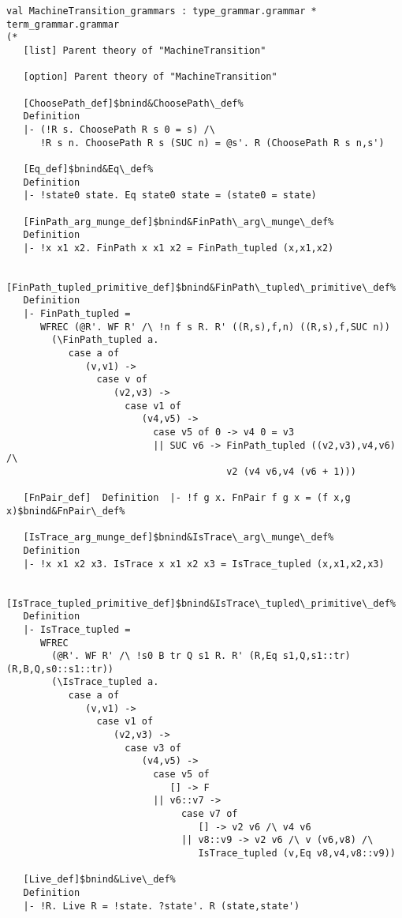 \documentclass[12pt]{article}
\begin{document}
\begin{footnotesize}
\begin{Verbatim}[commandchars=\$\&\%]
  val MachineTransition_grammars : type_grammar.grammar * term_grammar.grammar
(*
   [list] Parent theory of "MachineTransition"
   
   [option] Parent theory of "MachineTransition"
   
   [ChoosePath_def]$bnind&ChoosePath\_def%
   Definition
   |- (!R s. ChoosePath R s 0 = s) /\
      !R s n. ChoosePath R s (SUC n) = @s'. R (ChoosePath R s n,s')
   
   [Eq_def]$bnind&Eq\_def%
   Definition
   |- !state0 state. Eq state0 state = (state0 = state)
   
   [FinPath_arg_munge_def]$bnind&FinPath\_arg\_munge\_def%
   Definition
   |- !x x1 x2. FinPath x x1 x2 = FinPath_tupled (x,x1,x2)
   
   [FinPath_tupled_primitive_def]$bnind&FinPath\_tupled\_primitive\_def%
   Definition
   |- FinPath_tupled =
      WFREC (@R'. WF R' /\ !n f s R. R' ((R,s),f,n) ((R,s),f,SUC n))
        (\FinPath_tupled a.
           case a of
              (v,v1) ->
                case v of
                   (v2,v3) ->
                     case v1 of
                        (v4,v5) ->
                          case v5 of 0 -> v4 0 = v3
                          || SUC v6 -> FinPath_tupled ((v2,v3),v4,v6) /\
                                       v2 (v4 v6,v4 (v6 + 1)))
   
   [FnPair_def]  Definition  |- !f g x. FnPair f g x = (f x,g x)$bnind&FnPair\_def%
   
   [IsTrace_arg_munge_def]$bnind&IsTrace\_arg\_munge\_def%
   Definition
   |- !x x1 x2 x3. IsTrace x x1 x2 x3 = IsTrace_tupled (x,x1,x2,x3)
   
   [IsTrace_tupled_primitive_def]$bnind&IsTrace\_tupled\_primitive\_def%
   Definition
   |- IsTrace_tupled =
      WFREC
        (@R'. WF R' /\ !s0 B tr Q s1 R. R' (R,Eq s1,Q,s1::tr) (R,B,Q,s0::s1::tr))
        (\IsTrace_tupled a.
           case a of
              (v,v1) ->
                case v1 of
                   (v2,v3) ->
                     case v3 of
                        (v4,v5) ->
                          case v5 of
                             [] -> F
                          || v6::v7 ->
                               case v7 of
                                  [] -> v2 v6 /\ v4 v6
                               || v8::v9 -> v2 v6 /\ v (v6,v8) /\
                                  IsTrace_tupled (v,Eq v8,v4,v8::v9))
   
   [Live_def]$bnind&Live\_def%
   Definition
   |- !R. Live R = !state. ?state'. R (state,state')
   

\end{Verbatim}
\end{footnotesize}
\end{document}
